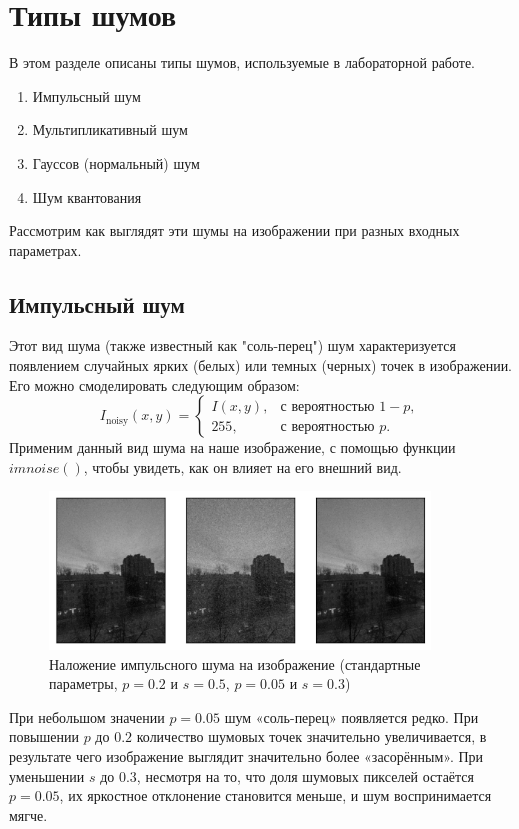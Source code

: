\documentclass[a4paper,12pt]{article}
\begin{document}
\section{Типы шумов}    
В этом разделе описаны типы шумов, используемые в лабораторной работе.
\begin{enumerate}
    \item  Импульсный шум
    \item  Мультипликативный шум        
    \item  Гауссов (нормальный) шум     
    \item  Шум квантования
\end{enumerate}
Рассмотрим как выглядят эти шумы на изображении при разных входных параметрах.
\subsection{Импульсный шум}
Этот вид шума (также известный как "соль-перец") шум характеризуется появлением случайных ярких (белых) или темных (черных) точек в изображении. Его можно смоделировать следующим образом:
\begin{equation*}
    I_{\text{noisy}}(x,y) = 
    \begin{cases}
    I(x,y), & \text{с вероятностью } 1-p,\\
    255, & \text{с вероятностью } p.
    \end{cases}
    \label{eq:impulse}
\end{equation*}
Применим данный вид шума на наше изображение, с помощью функции $imnoise()$, чтобы увидеть, как он влияет на его внешний вид.
\begin{figure}[H]
    \centering \includegraphics[width=0.9\textwidth]{results/sap_v.png}
    \caption{Наложение импульсного шума на изображение (стандартные параметры, $p=0.2$ и $s=0.5$, $p=0.05$ и $s=0.3$)}
\end{figure}
\noindent
При небольшом значении \(p=0.05\) шум «соль-перец» появляется редко. При повышении \(p\) до \(0.2\) количество шумовых точек значительно увеличивается, в результате чего изображение выглядит значительно более «засорённым». При уменьшении \(s\) до \(0.3\), несмотря на то, что доля шумовых пикселей остаётся \(p=0.05\), их яркостное отклонение становится меньше, и шум воспринимается мягче.
\end{document}

